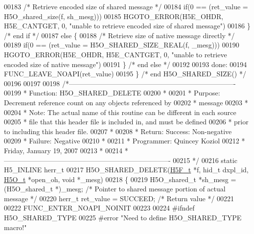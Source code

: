 \begin{DoxyCode}
00183         \textcolor{comment}{/* Retrieve encoded size of shared message */}
00184         \textcolor{keywordflow}{if}(0 == (ret\_value = H5O\_shared\_size(f, sh\_mesg)))
00185         HGOTO\_ERROR(H5E\_OHDR, H5E\_CANTGET, 0, \textcolor{stringliteral}{"unable to retrieve encoded size of shared message"})
00186     \} \textcolor{comment}{/* end if */}
00187     \textcolor{keywordflow}{else} \{
00188         \textcolor{comment}{/* Retrieve size of native message directly */}
00189         \textcolor{keywordflow}{if}(0 == (ret\_value = H5O\_SHARED\_SIZE\_REAL(f, \_mesg)))
00190         HGOTO\_ERROR(H5E\_OHDR, H5E\_CANTGET, 0, \textcolor{stringliteral}{"unable to retrieve encoded size of native message"})
00191     \} \textcolor{comment}{/* end else */}
00192 
00193 done:
00194     FUNC\_LEAVE\_NOAPI(ret\_value)
00195 \} \textcolor{comment}{/* end H5O\_SHARED\_SIZE() */}
00196 
00197 
00198 \textcolor{comment}{/*-------------------------------------------------------------------------}
00199 \textcolor{comment}{ * Function:    H5O\_SHARED\_DELETE}
00200 \textcolor{comment}{ *}
00201 \textcolor{comment}{ * Purpose:     Decrement reference count on any objects referenced by}
00202 \textcolor{comment}{ *              message}
00203 \textcolor{comment}{ *}
00204 \textcolor{comment}{ * Note:    The actual name of this routine can be different in each source}
00205 \textcolor{comment}{ *      file that this header file is included in, and must be defined}
00206 \textcolor{comment}{ *      prior to including this header file.}
00207 \textcolor{comment}{ *}
00208 \textcolor{comment}{ * Return:  Success:    Non-negative}
00209 \textcolor{comment}{ *      Failure:    Negative}
00210 \textcolor{comment}{ *}
00211 \textcolor{comment}{ * Programmer:  Quincey Koziol}
00212 \textcolor{comment}{ *              Friday, January 19, 2007}
00213 \textcolor{comment}{ *}
00214 \textcolor{comment}{ *-------------------------------------------------------------------------}
00215 \textcolor{comment}{ */}
00216 \textcolor{keyword}{static} H5\_INLINE herr\_t
00217 H5O\_SHARED\_DELETE(\hyperlink{struct_h5_f__t}{H5F\_t} *f, hid\_t dxpl\_id, \hyperlink{struct_h5_o__t}{H5O\_t} *open\_oh, \textcolor{keywordtype}{void} *\_mesg)
00218 \{
00219     H5O\_shared\_t *sh\_mesg = (H5O\_shared\_t *)\_mesg;     \textcolor{comment}{/* Pointer to shared message portion of actual
       message */}
00220     herr\_t ret\_value = SUCCEED;         \textcolor{comment}{/* Return value */}
00221 
00222     FUNC\_ENTER\_NOAPI\_NOINIT
00223 
00224 \textcolor{preprocessor}{#ifndef H5O\_SHARED\_TYPE}
00225 \textcolor{preprocessor}{#error "Need to define H5O\_SHARED\_TYPE macro!"}

\end{DoxyCode}
